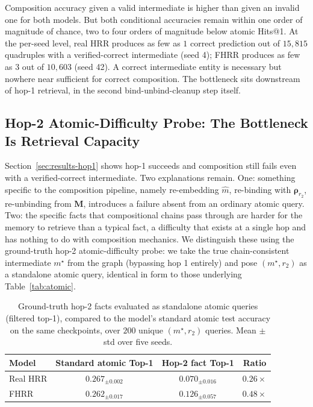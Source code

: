 \documentclass[11pt]{article}
\theoremstyle{definition}
\newcommand{\rv}[1]{\boldsymbol{\rho}_{#1}}
\newcommand{\mem}{\mathbf{M}}
\begin{document}
Composition accuracy given a valid intermediate is higher than given an invalid
one for both models. But both conditional accuracies remain within one order of
magnitude of chance, two to four orders of magnitude below atomic Hits@1.
At the per-seed level, real HRR produces as few as $1$ correct prediction out
of $15{,}815$ quadruples with a verified-correct intermediate (seed 4); FHRR
produces as few as $3$ out of $10{,}603$ (seed 42). A correct intermediate entity
is necessary but nowhere near sufficient for correct composition. The bottleneck
sits downstream of hop-1 retrieval, in the second bind-unbind-cleanup step itself.

\subsection{Hop-2 Atomic-Difficulty Probe: The Bottleneck Is Retrieval Capacity}
\label{sec:results-mechanism}

Section~\ref{sec:results-hop1} shows hop-1 succeeds and composition still fails
even with a verified-correct intermediate. Two explanations remain. One:
something specific to the composition pipeline, namely re-embedding $\hat m$,
re-binding with $\rv{r_2}$, re-unbinding from $\mem$, introduces a failure
absent from an ordinary atomic query. Two: the specific facts that
compositional chains pass through are harder for the memory to retrieve than
a typical fact, a difficulty that exists at a single hop and has nothing to do
with composition mechanics. We distinguish these using the ground-truth hop-2
atomic-difficulty probe: we take the true chain-consistent intermediate
$m^\star$ from the graph (bypassing hop 1 entirely) and pose $(m^\star, r_2)$
as a standalone atomic query, identical in form to those underlying
Table~\ref{tab:atomic}.

\begin{table}[H]
\centering
\caption{Ground-truth hop-2 facts evaluated as standalone atomic queries
(filtered top-1), compared to the model's standard atomic test accuracy on
the same checkpoints, over $200$ unique $(m^\star, r_2)$ queries. Mean $\pm$
std over five seeds.}
\label{tab:hop2atomic}
\begin{tabular}{lccc}
\toprule
Model & Standard atomic Top-1 & Hop-2 fact Top-1 & Ratio \\
\midrule
Real HRR & $0.267_{\pm 0.002}$ & $0.070_{\pm 0.016}$ & $0.26\times$ \\
FHRR     & $0.262_{\pm 0.017}$ & $0.126_{\pm 0.057}$ & $0.48\times$ \\
\bottomrule
\end{tabular}
\end{table}
\end{document}
